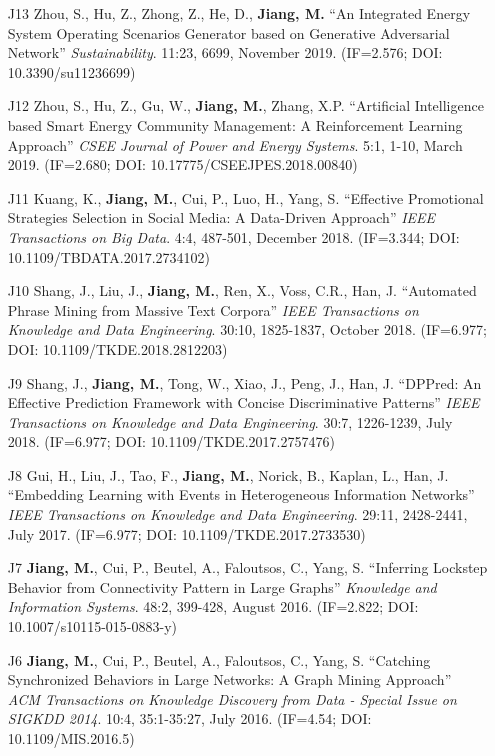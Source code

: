 \documentclass[10pt]{article}
\newenvironment{myindentpar}[1]%
{\begin{list}{}%
         {\setlength{\leftmargin}{#1}}%
         \item[]%
}
{\end{list}}
\newcounter{list}
\begin{document}
\begin{myindentpar}{0.00cm}
\begin{enumerate}[leftmargin=.5cm]
\item[J13] Zhou, S., Hu, Z., Zhong, Z., He, D., \textbf{Jiang, M.} ``An Integrated Energy System Operating Scenarios Generator based on Generative Adversarial Network'' \textit{Sustainability}. 11:23, 6699, November 2019. (IF=2.576; DOI: 10.3390/su11236699)

\item[J12] Zhou, S., Hu, Z., Gu, W., \textbf{Jiang, M.}, Zhang, X.P. ``Artificial Intelligence based Smart Energy Community Management: A Reinforcement Learning Approach'' \textit{CSEE Journal of Power and Energy Systems}. 5:1, 1-10, March 2019. (IF=2.680; DOI: 10.17775/CSEEJPES.2018.00840)

\item[J11] Kuang, K., \textbf{Jiang, M.}, Cui, P., Luo, H., Yang, S. ``Effective Promotional Strategies Selection in Social Media: A Data-Driven Approach'' \textit{IEEE Transactions on Big Data}. 4:4, 487-501, December 2018. (IF=3.344; DOI: 10.1109/TBDATA.2017.2734102)

\item[J10] Shang, J., Liu, J., \textbf{Jiang, M.}, Ren, X., Voss, C.R., Han, J. ``Automated Phrase Mining from Massive Text Corpora'' \textit{IEEE Transactions on Knowledge and Data Engineering}. 30:10, 1825-1837, October 2018. (IF=6.977; DOI: 10.1109/TKDE.2018.2812203)

\item[J9] Shang, J., \textbf{Jiang, M.}, Tong, W., Xiao, J., Peng, J., Han, J. ``DPPred: An Effective Prediction Framework with Concise Discriminative Patterns'' \textit{IEEE Transactions on Knowledge and Data Engineering}. 30:7, 1226-1239, July 2018. (IF=6.977; DOI: 10.1109/TKDE.2017.2757476)

\item[J8] Gui, H., Liu, J., Tao, F., \textbf{Jiang, M.}, Norick, B., Kaplan, L., Han, J. ``Embedding Learning with Events in Heterogeneous Information Networks'' \textit{IEEE Transactions on Knowledge and Data Engineering}. 29:11, 2428-2441, July 2017. (IF=6.977; DOI: 10.1109/TKDE.2017.2733530)

\item[J7] \textbf{Jiang, M.}, Cui, P., Beutel, A., Faloutsos, C., Yang, S. ``Inferring Lockstep Behavior from Connectivity Pattern in Large Graphs'' \textit{Knowledge and Information Systems}. 48:2, 399-428, August 2016. (IF=2.822; DOI: 10.1007/s10115-015-0883-y)

\item[J6] \textbf{Jiang, M.}, Cui, P., Beutel, A., Faloutsos, C., Yang, S. ``Catching Synchronized Behaviors in Large Networks: A Graph Mining Approach'' \textit{ACM Transactions on Knowledge Discovery from Data - Special Issue on SIGKDD 2014}. 10:4, 35:1-35:27, July 2016. (IF=4.54; DOI: 10.1109/MIS.2016.5)


\end{enumerate}
\end{myindentpar}
\end{document}
